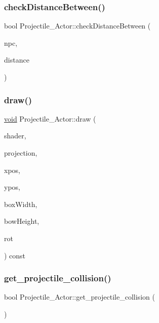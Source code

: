 \subsubsection{\texorpdfstring{check\+Distance\+Between()}{checkDistanceBetween()}}
{\footnotesize\ttfamily bool Projectile\+\_\+\+Actor\+::check\+Distance\+Between (\begin{DoxyParamCaption}\item[{\hyperlink{classNPC__Actor}{N\+P\+C\+\_\+\+Actor} $\ast$}]{npc,  }\item[{float}]{distance }\end{DoxyParamCaption})}

\mbox{\label{classProjectile__Actor_ab2cbe2e37cc22542c5a4446e33075300}} 
\subsubsection{\texorpdfstring{draw()}{draw()}}
{\footnotesize\ttfamily \hyperlink{imgui__impl__opengl3__loader_8h_ac668e7cffd9e2e9cfee428b9b2f34fa7}{void} Projectile\+\_\+\+Actor\+::draw (\begin{DoxyParamCaption}\item[{std\+::shared\+\_\+ptr$<$ \hyperlink{classShader__Actor}{Shader\+\_\+\+Actor} $>$}]{shader,  }\item[{glm\+::mat4}]{projection,  }\item[{float}]{xpos,  }\item[{float}]{ypos,  }\item[{float}]{box\+Width,  }\item[{float}]{bow\+Height,  }\item[{float}]{rot }\end{DoxyParamCaption}) const}

\mbox{\label{classProjectile__Actor_a205f34a830ec6d19a87d978d63d52922}} 
\subsubsection{\texorpdfstring{get\+\_\+projectile\+\_\+collision()}{get\_projectile\_collision()}}
{\footnotesize\ttfamily bool Projectile\+\_\+\+Actor\+::get\+\_\+projectile\+\_\+collision (\begin{DoxyParamCaption}{ }\end{DoxyParamCaption})\hspace{0.3cm}{\ttfamily [inline]}}

